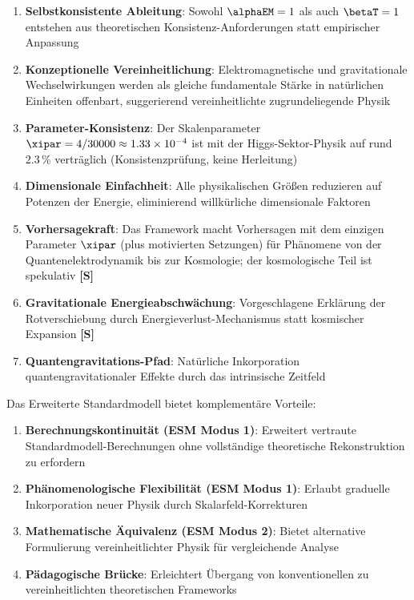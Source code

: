 	\begin{enumerate}
		\item \textbf{Selbstkonsistente Ableitung}: Sowohl $\alphaEM = 1$ als auch $\betaT = 1$ entstehen aus theoretischen Konsistenz-Anforderungen statt empirischer Anpassung
		
		\item \textbf{Konzeptionelle Vereinheitlichung}: Elektromagnetische und gravitationale Wechselwirkungen werden als gleiche fundamentale Stärke in natürlichen Einheiten offenbart, suggerierend vereinheitlichte zugrundeliegende Physik
		
		\item \textbf{Parameter-Konsistenz}: Der Skalenparameter $\xipar = 4/30000 \approx 1.33 \times 10^{-4}$ ist mit der Higgs-Sektor-Physik auf rund $2.3\,\%$ verträglich (Konsistenzprüfung, keine Herleitung)
		
		\item \textbf{Dimensionale Einfachheit}: Alle physikalischen Größen reduzieren auf Potenzen der Energie, eliminierend willkürliche dimensionale Faktoren
		
		\item \textbf{Vorhersagekraft}: Das Framework macht Vorhersagen mit dem einzigen Parameter $\xipar$ (plus motivierten Setzungen) für Phänomene von der Quantenelektrodynamik bis zur Kosmologie; der kosmologische Teil ist spekulativ \textbf{[S]}
		
		\item \textbf{Gravitationale Energieabschwächung}: Vorgeschlagene Erklärung der Rotverschiebung durch Energieverlust-Mechanismus statt kosmischer Expansion \textbf{[S]}
		
		\item \textbf{Quantengravitations-Pfad}: Natürliche Inkorporation quantengravitationaler Effekte durch das intrinsische Zeitfeld
	\end{enumerate}
	
	Das Erweiterte Standardmodell bietet komplementäre Vorteile:
	
	\begin{enumerate}
		\item \textbf{Berechnungskontinuität (ESM Modus 1)}: Erweitert vertraute Standardmodell-Berechnungen ohne vollständige theoretische Rekonstruktion zu erfordern
		
		\item \textbf{Phänomenologische Flexibilität (ESM Modus 1)}: Erlaubt graduelle Inkorporation neuer Physik durch Skalarfeld-Korrekturen
		
		\item \textbf{Mathematische Äquivalenz (ESM Modus 2)}: Bietet alternative Formulierung vereinheitlichter Physik für vergleichende Analyse
		
		\item \textbf{Pädagogische Brücke}: Erleichtert Übergang von konventionellen zu vereinheitlichten theoretischen Frameworks
	\end{enumerate}
	
